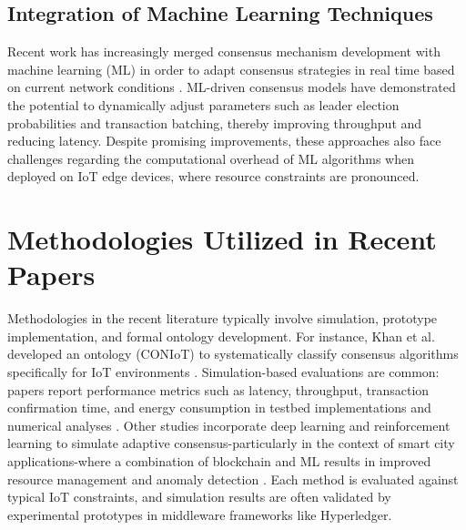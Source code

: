 \documentclass[12pt,onecolumn]{IEEEtran} %
\begin{document}
\subsection{Integration of Machine Learning Techniques}
Recent work has increasingly merged consensus mechanism development with machine learning (ML) in order to adapt consensus strategies in real time based on current network conditions \cite{alam2023anoverviewof, haque2024ascalableblockchain, guru2023asurveyon}. ML-driven consensus models have demonstrated the potential to dynamically adjust parameters such as leader election probabilities and transaction batching, thereby improving throughput and reducing latency. Despite promising improvements, these approaches also face challenges regarding the computational overhead of ML algorithms when deployed on IoT edge devices, where resource constraints are pronounced.

\section{Methodologies Utilized in Recent Papers}
Methodologies in the recent literature typically involve simulation, prototype implementation, and formal ontology development. For instance, Khan et al. developed an ontology (CONIoT) to systematically classify consensus algorithms specifically for IoT environments \cite{khan2022asurveyand, khan2022asurveyand}. Simulation-based evaluations are common: papers report performance metrics such as latency, throughput, transaction confirmation time, and energy consumption in testbed implementations and numerical analyses \cite{ali2022blockchainenabledarchitecture, bryant2022keychallengesin}. Other studies incorporate deep learning and reinforcement learning to simulate adaptive consensus-particularly in the context of smart city applications-where a combination of blockchain and ML results in improved resource management and anomaly detection \cite{alam2023anoverviewof, guru2023asurveyon}. Each method is evaluated against typical IoT constraints, and simulation results are often validated by experimental prototypes in middleware frameworks like Hyperledger.
\end{document}
